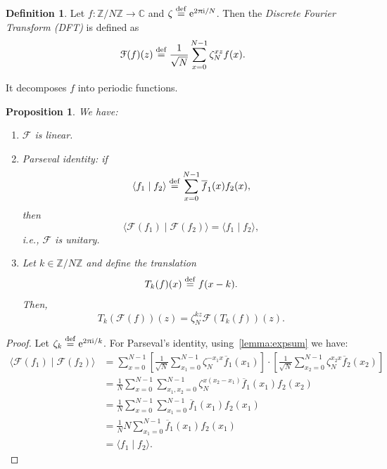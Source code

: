 \documentclass[12pt]{amsart}
\theoremstyle{plain}
\newtheorem{proposition}[theorem]{Proposition}
\theoremstyle{definition}
\newtheorem{definition}[theorem]{Definition}
\theoremstyle{remark}
\newcommand{\Z}{\mathbb{Z}}
\newcommand{\C}{\mathbb{C}}
\newcommand{\me}{\mathrm{e}}
\newcommand{\mi}{\mathrm{i}}
\newcommand{\mpi}{\uppi}
\newcommand{\idef}{\overset{{\rm def}}{=}}
\renewcommand{\bar}{\overline}
\newcommand{\ft}{\mathcal{F}}  %
\begin{document}
\begin{definition}
  Let $f : \Z/{N}\Z \to \C$ and $\zeta \idef \me^{2\mpi\mi/N}$.  Then the \emph{Discrete Fourier Transform (DFT)} is defined as
  \[
    \ft(f)(z) \idef \frac{1}{\sqrt{N}} \sum_{x=0}^{N-1} \zeta_N^{xz} f(x).
  \]
\end{definition}

It decomposes $f$ into periodic functions.


\begin{proposition}
  We have:
  \begin{enumerate}

  \item $\ft$ is linear.

  \item \emph{Parseval identity}: if
    \[
      \langle f_1 \mid f_2 \rangle \idef \sum_{x=0}^{N-1} \bar{f}_1(x) f_2(x),
    \]
    then
    \[
      \langle \ft(f_1) \mid \ft(f_2) \rangle = \langle f_1 \mid f_2 \rangle,
    \]
    i.e., $\ft$ is unitary.

  \item Let $k \in \Z/{N}\Z$ and define the translation
    \[
      T_k(f)(x) \idef f(x - k).
    \]
    Then,
    \[
      T_k(\ft(f))(z) = \zeta_N^{kz} \ft(T_k(f))(z).
    \]

  \end{enumerate}
\end{proposition}

\begin{proof}
  Let $\zeta_k \idef \me^{2 \mpi \mi/k}$.   For Parseval's identity, using~\vref{lemma:expsum} we have:
  \begin{align*}
    \langle \ft(f_1) \mid \ft(f_2) \rangle
    &= \sum_{x=0}^{N-1} \left[ \frac{1}{\sqrt{N}} \sum_{x_1=0}^{N-1} \zeta_N^{-x_1x} \bar{f}_1(x_1)\right] \cdot \left[ \frac{1}{\sqrt{N}} \sum_{x_2=0}^{N-1} \zeta_N^{x_2x} \bar{f}_2(x_2)\right] \\
    &= \frac{1}{N} \sum_{x=0}^{N-1} \sum_{x_1, x_2=0}^{N-1} \zeta_N^{x(x_2 - x_1)} \bar{f}_1(x_1) f_2(x_2) \\
    &= \frac{1}{N} \sum_{x=0}^{N-1} \sum_{x_1=0}^{N-1} \bar{f}_1(x_1) f_2(x_1) \\
    &= \frac{1}{N} N \sum_{x_1=0}^{N-1} \bar{f}_1(x_1) f_2(x_1) \\
    &= \langle f_1 \mid f_2 \rangle.
  \end{align*}
\end{proof}
\end{document}
